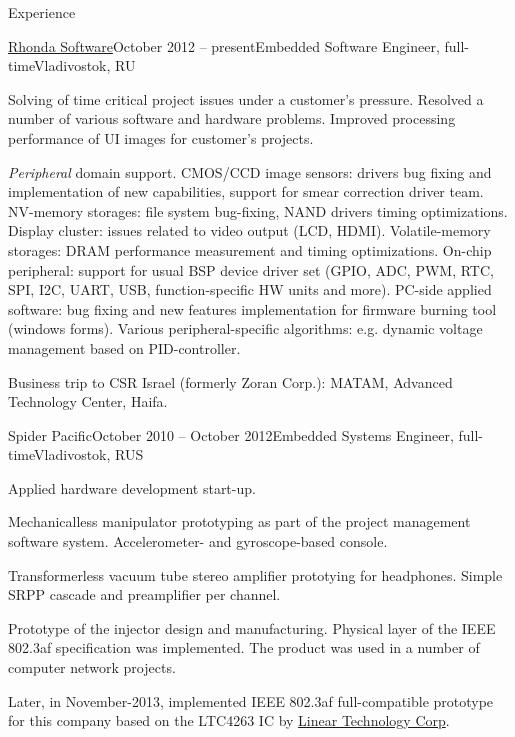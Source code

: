 \documentclass{template}
\begin{document}
\begin{rSection}{Experience}
\begin{rCompany}{\href{http://www.rhondasoftware.com}{Rhonda Software}}{October 2012 -- present}{Embedded Software Engineer, full-time}{Vladivostok, RU}
\item Solving of time critical project issues under a customer's pressure. Resolved a number of various  software and hardware
      problems. Improved processing performance of UI images for customer's projects.
\item \textit{Peripheral} domain support. CMOS/CCD image sensors: drivers bug fixing and implementation of new capabilities, support for smear
      correction driver team. NV-memory storages: file system bug-fixing, NAND drivers timing optimizations. Display cluster: issues related to
      video output (LCD, HDMI). Volatile-memory storages: DRAM performance measurement and timing optimizations. On-chip peripheral: support for
      usual BSP device driver set (GPIO, ADC, PWM, RTC, SPI, I2C, UART, USB, function-specific HW units and more). PC-side applied software: bug
      fixing and new features implementation for firmware burning tool (windows forms). Various peripheral-specific algorithms: e.g. dynamic
      voltage management based on PID-controller.
\item Business trip to CSR Israel (formerly Zoran Corp.): MATAM, Advanced Technology Center, Haifa. \newline

\end{rCompany}
\begin{rCompany}{Spider Pacific}{October 2010 -- October 2012}{Embedded Systems Engineer, full-time}{Vladivostok, RUS}

\item Applied hardware development start-up.
\item Mechanicalless manipulator prototyping as part of the project management software system. \newline Accelerometer- and gyroscope-based console.
\item Transformerless vacuum tube stereo amplifier prototying for headphones. \newline Simple SRPP cascade and preamplifier per channel.
\item Prototype of the  injector design and manufacturing. Physical layer of the IEEE
      802.3af specification was implemented. The product was used in a number of computer network projects.
\item Later, in November-2013, implemented IEEE 802.3af full-compatible prototype for this company based on the LTC4263 IC by
      \href{http://www.linear.com}{Linear Technology Corp}.

\end{rCompany}
\end{rSection}
\end{document}
